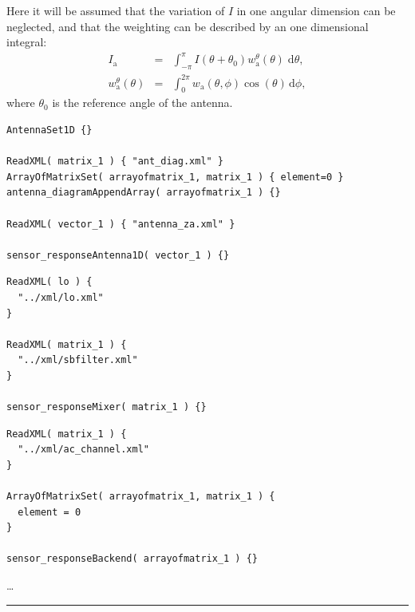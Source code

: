 Here it will be assumed that the variation of $I$ in one angular dimension can be neglected, and that the weighting can be described by an one dimensional integral:
\begin{eqnarray}
\label{eq:sensor:antenna:1D}
  I_\mathrm{a} &=& \int_{-\pi}^\pi\!\!\!\!I(\theta+\theta_0) 
  w_\mathrm{a}^\theta(\theta)\;\mathrm{d}\theta,\\
  w_\mathrm{a}^\theta(\theta) &=& \int_0^{2\pi}\!\!\!\!
  w_\mathrm{a}(\theta,\phi)\cos(\theta)\,\mathrm{d}\phi,
\end{eqnarray}
where $\theta_0$ is the reference angle of the antenna.


\begin{verbatim}
AntennaSet1D {}

ReadXML( matrix_1 ) { "ant_diag.xml" }
ArrayOfMatrixSet( arrayofmatrix_1, matrix_1 ) { element=0 }
antenna_diagramAppendArray( arrayofmatrix_1 ) {}

ReadXML( vector_1 ) { "antenna_za.xml" }

sensor_responseAntenna1D( vector_1 ) {}
\end{verbatim}

\begin{verbatim}
ReadXML( lo ) {
  "../xml/lo.xml"
}

ReadXML( matrix_1 ) {
  "../xml/sbfilter.xml"
}

sensor_responseMixer( matrix_1 ) {}
\end{verbatim}

\begin{verbatim}
ReadXML( matrix_1 ) {
  "../xml/ac_channel.xml"
}

ArrayOfMatrixSet( arrayofmatrix_1, matrix_1 ) {
  element = 0
}

sensor_responseBackend( arrayofmatrix_1 ) {}
\end{verbatim}


 \ldots


\hrule


\label{sec:sensor:WSM}




